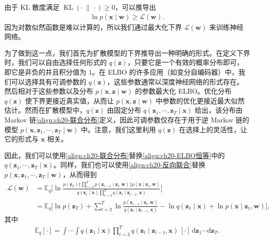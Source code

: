 \documentclass[../../main.tex]{subfiles}
\begin{document}
由于 KL 散度满足 $\operatorname{KL}(\cdot\,\|\,\cdot)\geqslant 0$，可以推导出
\begin{align}
\ln p(\bm{x}\mid\bm{w})\geqslant\mathcal{L}(\bm{w}).
\label{align:ch20-下界}
\end{align}
因为对数似然函数是难以计算的，所以我们通过最大化下界 $\mathcal{L}(\bm{w})$ 来训练神经网络。

为了做到这一点，我们首先为扩散模型的下界推导出一种明确的形式。在定义下界时，我们可以自由选择任何形式的 $q(\bm{z})$，只要它是一个有效的概率分布即可，即它是非负的并且积分值为 $1$。在 ELBO 的许多应用（如变分自编码器）中，我们可以选择具有可调参数的 $q(\bm{z})$，这些参数通常以深度神经网络的形式存在。然后相对于这些参数以及分布 $p(\bm{x},\bm{z}\mid\bm{w})$ 的参数最大化 ELBO。优化分布 $q(\bm{z})$ 使下界更接近真实值，从而让 $p(\bm{x},\bm{z}\mid\bm{w})$ 中参数的优化更接近最大似然估计。然而在扩散模型中，$q(\bm{z})$ 由固定分布 $q(\bm{z}_1,\cdots,\bm{z}_T\mid\bm{x})$ 给出，该分布由 Markov 链\eqref{align:ch20-联合分布}定义，因此可调参数仅存在于用于逆 Markov 链的模型 $p(\bm{x},\bm{z}_1,\cdots,\bm{z}_T\mid\bm{w})$ 中。注意，我们这里利用 $q(\bm{z})$ 在选择上的灵活性，让它的形式与 $\bm{x}$ 相关。

因此，我们可以使用\eqref{align:ch20-联合分布}替换\eqref{align:ch20-ELBO恒等}中的 $q(\bm{z}_1,\cdots,\bm{z}_T\mid\bm{x})$。同样，我们也可以使用\eqref{align:ch20-反向联合}替换 $p(\bm{x},\bm{z}_1,\cdots,\bm{z}_T\mid\bm{w})$，从而得到
\begin{align}
\mathcal{L}(\bm{w})&=\mathbb{E}_{q}\Big[\ln\frac{p(\bm{z}_T)\Big\{\prod_{t=2}^{T}p(\bm{z}_{t-1}\mid\bm{z}_t,\bm{w})\Big\}p(\bm{x}\mid\bm{z}_1,\bm{w})}{q(\bm{z}_1\mid\bm{x})\prod_{t=2}^{T}q(\bm{z}_t\mid\bm{z}_{t-1},\bm{x})}\Big]\nonumber\\
&=\mathbb{E}_{q}\Big[\ln p(\bm{z}_T)+\sum_{t=2}^{T}\ln\frac{p(\bm{z}_{t-1}\mid\bm{z}_t,\bm{w})}{q(\bm{z}_t\mid\bm{z}_{t-1},\bm{x})}-\ln q(\bm{z}_1\mid\bm{x})+\ln p(\bm{x}\mid\bm{z}_1,\bm{w})\Big],
\label{align:ch20-展开下界}
\end{align}
其中
\begin{align}
\mathbb{E}_{q}[\cdot]=\int\cdots\int q(\bm{z}_1\mid\bm{x})\prod_{t=2}^{T}q(\bm{z}_t\mid\bm{z}_{t-1},\bm{x})\,[\cdot]\,\mathrm{d}\bm{z}_1\cdots\mathrm{d}\bm{z}_T.
\label{align:ch20-期望定义}
\end{align}
\end{document}
